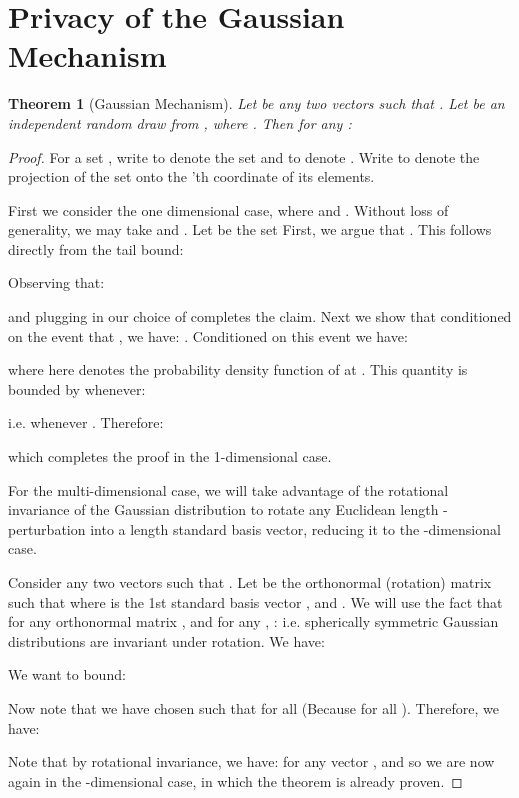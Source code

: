 \documentclass[letterpaper,11pt]{article}
\newtheorem{theorem}{Theorem}[section]
\theoremstyle{definition}
\begin{document}




\appendix
\section{Privacy of the Gaussian Mechanism}

\begin{theorem}[Gaussian Mechanism]
Let  be any two vectors such that . Let  be an independent random draw from , where . Then for any :

\end{theorem}
\begin{proof}
For a set , write  to denote the set  and  to denote . Write  to denote the projection of the set onto the 'th coordinate of its elements.

First we consider the one dimensional case, where  and . Without loss of generality, we may take  and . Let  be the set  First, we argue that . This follows directly from the tail bound:

Observing that:

and plugging in our choice of   completes the claim. Next we show that conditioned on the event that , we have:  . Conditioned on this event we have:

where here  denotes the probability density function of  at .
This quantity is bounded by  whenever:

i.e. whenever .
Therefore:

which completes the proof in the 1-dimensional case.



For the multi-dimensional case, we will take advantage of the rotational invariance of the Gaussian distribution to rotate any Euclidean length -perturbation into a length  standard basis vector, reducing it to the -dimensional case.

Consider any two vectors  such that .  Let  be the orthonormal (rotation) matrix such that  where  is the 1st standard basis vector , and . We will use the fact that for any orthonormal matrix , and for any , : i.e. spherically symmetric Gaussian distributions are invariant under rotation. We have:

We want to bound:

 Now note that we have chosen  such that  for all  (Because  for all ). Therefore, we have:
 

Note that by rotational invariance, we have:  for any vector , and so we are now again in the -dimensional case, in which the theorem is already proven.

\end{proof}
\end{document}
